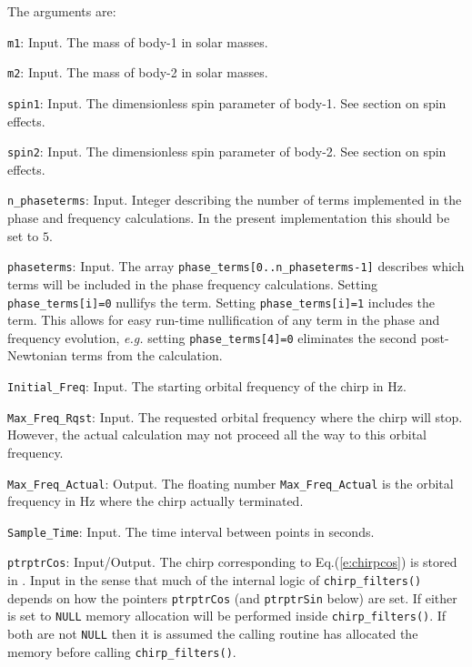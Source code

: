 The arguments are:
\begin{description}
\item{\tt m1}: Input.  The mass of body-1 in solar masses.
\item{\tt m2}: Input.  The mass of body-2 in solar masses.
\item{\tt spin1}: Input.  The dimensionless spin parameter 
  of body-1. See section on spin effects.
\item{\tt spin2}: Input.  The dimensionless spin parameter 
  of body-2. See section on spin effects.
\item{\tt n\_phaseterms}: Input. Integer describing 
 the number of terms implemented in the phase and frequency 
 calculations. In the present implementation this should be 
 set to $5$.
\item{\tt phaseterms}: Input. The array 
  {\tt phase\_terms[0..n\_phaseterms-1]} describes which 
  terms will be included in the phase frequency calculations.
  Setting  {\tt phase\_terms[i]=0} nullifys the term.
  Setting  {\tt phase\_terms[i]=1} includes the term.
  This allows for easy run-time nullification of any term in the 
  phase and frequency evolution, {\it e.g.} setting 
  {\tt phase\_terms[4]=0} eliminates the second post-Newtonian
  terms from the calculation.
\item{\tt Initial\_Freq}: Input.  The starting orbital frequency of the
  chirp in Hz.
\item{\tt Max\_Freq\_Rqst}: Input.  The requested orbital frequency
  where the chirp will stop. However, the actual calculation
  may not proceed all the way to this orbital frequency.
\item{\tt Max\_Freq\_Actual}: Output. The floating 
  number {\tt *Max\_Freq\_Actual}
  is the orbital frequency in Hz where the chirp actually terminated.
\item{\tt Sample\_Time}: Input.  The time interval between points
  in seconds.
\item{\tt ptrptrCos}: Input/Output. 
  The chirp corresponding to Eq.(\ref{e:chirpcos}) is stored in
  .  Input in the
  sense that much of the internal logic of {\tt  chirp\_filters()}
  depends on how the pointers {\tt *ptrptrCos} (and {\tt *ptrptrSin}
  below) are set.  If either is set to {\tt NULL} memory allocation
  will be performed inside  {\tt  chirp\_filters()}. If both are not
  {\tt NULL} then it is assumed the calling routine has allocated the
  memory before calling  {\tt  chirp\_filters()}.

\end{description}
